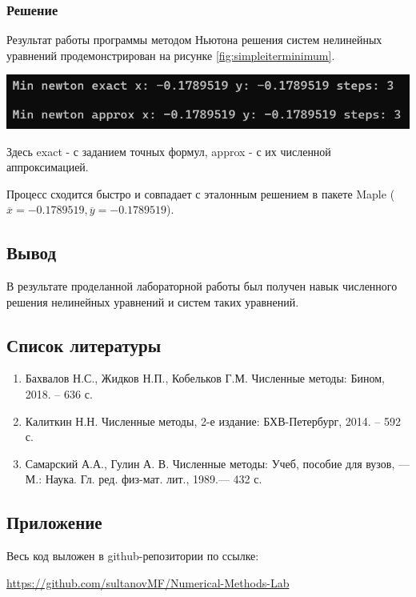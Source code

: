\documentclass[a4paper, fontsize=14pt]{article}
\begin{document}
\subsubsection*{Решение}

Результат работы программы методом Ньютона решения систем нелинейных уравнений продемонстрирован на рисунке \ref{fig:simpleiterminimum}.

\begin{center}
    \includegraphics[scale=0.8]{src/newton minimum prog.png}
    \label{fig:simpleiterminimum}
\end{center}

Здесь exact - с заданием точных формул, approx - с их численной аппроксимацией.

Процесс сходится быстро и совпадает с эталонным решением в пакете Maple ($\overline{x} = -0.1789519, \overline{y} = -0.1789519$).

\newpage
\subsection*{Вывод}
В результате проделанной лабораторной работы был получен навык численного решения нелинейных уравнений и систем таких уравнений.
\newpage
\subsection*{Список литературы}
\begin{enumerate}
    \item Бахвалов Н.С., Жидков Н.П., Кобельков Г.М. Численные методы: Бином, 2018. – 636 с. 
    \item Калиткин Н.Н. Численные методы, 2-е издание: БХВ-Петербург, 2014. – 592 с.
    \item Самарский А.А., Гулин А. В. Численные методы: Учеб, пособие для вузов, — М.: Наука. Гл. ред. физ-мат. лит., 1989.— 432 с.
\end{enumerate}
\newpage
\subsection*{Приложение}
Весь код выложен в github-репозитории по ссылке: 

\url{https://github.com/sultanovMF/Numerical-Methods-Lab}
\end{document}
